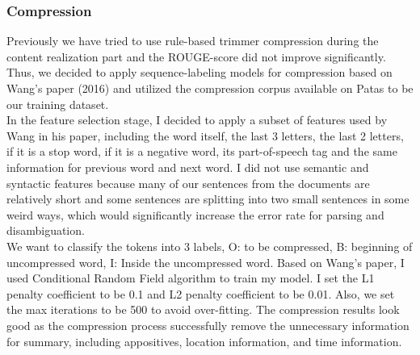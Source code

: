 \documentclass[11pt]{article}
\begin{document}
\subsubsection{Compression}
Previously we have tried to use rule-based trimmer compression during the content realization part and the ROUGE-score did not improve significantly. Thus, we decided to apply sequence-labeling models for compression based on Wang's paper (2016) and utilized the compression corpus available on Patas to be our training dataset.\\
\indent
In the feature selection stage, I decided to apply a subset of features used by Wang in his paper, including the word itself, the last 3 letters, the last 2 letters, if it is a stop word, if it is a negative word, its part-of-speech tag and the same information for previous word and next word. I did not use semantic and syntactic features because many of our sentences from the documents are relatively short and some sentences are splitting into two small sentences in some weird ways, which would significantly increase the error rate for parsing and disambiguation.\\
\indent
We want to classify the tokens into 3 labels, O: to be compressed, B: beginning of uncompressed word, I: Inside the uncompressed word. Based on Wang's paper, I used Conditional Random Field algorithm to train my model. I set the L1 penalty coefficient to be 0.1 and L2 penalty coefficient to be 0.01. Also, we set the max iterations to be 500 to avoid over-fitting. The compression results look good as the compression process successfully remove the unnecessary information for summary, including appositives, location information, and time information.  
\end{document}
